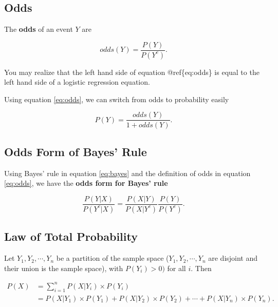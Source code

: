 \documentclass[
]{book}
\begin{document}
\subsection{Odds}\label{odds}

The \textbf{odds} of an event \(Y\) are

\begin{equation} 
odds(Y) = \frac{P(Y)}{P(Y^c)}.
\label{eq:odds}
\end{equation}

You may realize that the left hand side of equation @ref\{eq:odds\} is equal to the left hand side of a logistic regression equation.

Using equation \eqref{eq:odds}, we can switch from odds to probability easily

\begin{equation} 
P(Y) = \frac{odds(Y)}{1 + odds(Y)}.
\label{eq:odds2}
\end{equation}

\subsection{Odds Form of Bayes' Rule}\label{odds-form-of-bayes-rule}

Using Bayes' rule in equation \eqref{eq:bayes} and the definition of odds in equation \eqref{eq:odds}, we have the \textbf{odds form for Bayes' rule}

\begin{equation} 
\frac{P(Y|X)}{P(Y^c|X)} = \frac{P(X|Y)}{P(X|Y^c)} \frac{P(Y)}{P(Y^c)}. 
\label{eq:oddsbayes}
\end{equation}

\subsection{Law of Total Probability}\label{law-of-total-probability}

Let \(Y_1, Y_2, \cdots, Y_n\) be a partition of the sample space (\(Y_1, Y_2, \cdots, Y_n\) are disjoint and their union is the sample space), with \(P(Y_i) > 0)\) for all \(i\). Then

\begin{equation} 
\begin{split}
P(X) &= \sum_{i=1}^n P(X|Y_i) \times P(Y_i)\\
    &= P(X|Y_1) \times P(Y_1) + P(X|Y_2) \times P(Y_2) + \cdots + P(X|Y_n) \times P(Y_n).
\end{split}
\label{eq:total}
\end{equation}
\end{document}
